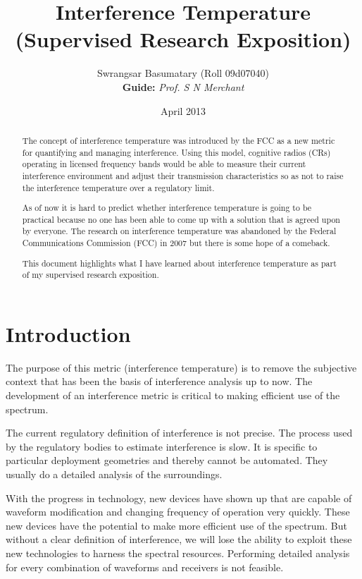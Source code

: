 \documentclass[12pt]{article}
\title{Interference Temperature \\ (Supervised Research Exposition)}
\author{Swrangsar Basumatary (Roll 09d07040) \\ \textbf{Guide:} \emph{Prof. S N Merchant}}
\date{April 2013}
\begin{document}
\maketitle

\begin{abstract}

The concept of interference temperature was introduced by the FCC as a new metric for quantifying and managing interference. Using this model, cognitive radios (CRs) operating in licensed frequency bands would be able to measure their current interference environment and adjust their transmission characteristics so as not to raise the interference temperature over a regulatory limit.

As of now it is hard to predict whether interference temperature is going to be practical because no one has been able to come up with a solution that is agreed upon by everyone. The research on interference temperature was abandoned by the Federal Communications Commission (FCC) in 2007 but there is some hope of a comeback.

This document highlights what I have learned about interference temperature as part of my supervised research exposition.

\end{abstract}

\section{Introduction}

The purpose of this metric (interference temperature) is to remove the subjective context that has been the basis of interference analysis up to now\cite{kolodzy2006}. The development of an interference metric is critical to making efficient use of the spectrum.

The current regulatory definition of interference is not precise. The process used by the regulatory bodies to estimate interference is slow. It is specific to particular deployment geometries and thereby cannot be automated. They usually do a  detailed analysis of the surroundings.

With the progress in technology, new devices have shown up that are capable of waveform modification and changing frequency of operation very quickly. These new devices have the potential to make more efficient use of the spectrum. But without a clear definition of interference, we will lose the ability to exploit these new technologies to harness the spectral resources. Performing detailed analysis for every combination of waveforms and receivers is not feasible.
\end{document}
